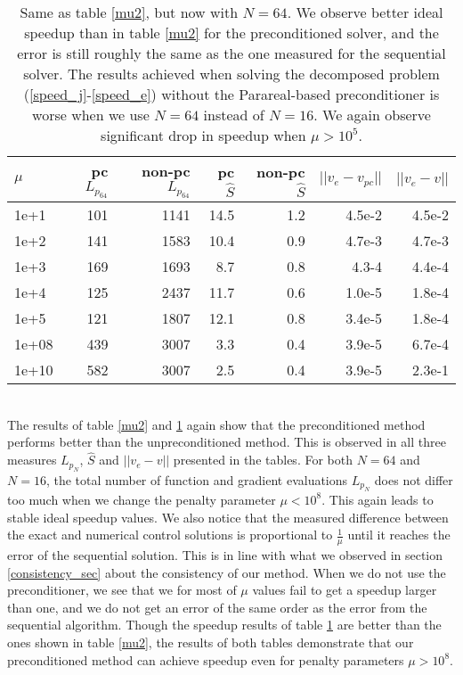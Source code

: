 \begin{table}[h!]
\centering
\caption{Same as table \ref{mu2}, but now with $N=64$. We observe better ideal speedup than in table \ref{mu2} for the preconditioned solver, and the error is still roughly the same as the one measured for the sequential solver. The results achieved when solving the decomposed problem (\ref{speed_j}-\ref{speed_e}) without the Parareal-based preconditioner is worse when we use $N=64$ instead of $N=16$. We again observe significant drop in speedup when $\mu>10^5$.}
\label{mu3}
\begin{tabular}{lrrrrrr}
\toprule
{} $\mu$&    pc $L_{p_{64}}$ & non-pc $L_{p_{64}}$    &  pc $\hat S$ & non-pc $\hat S$ &  $||v_e-v_{pc}||$ &      $||v_e-v||$\\
\midrule
1e+1  &  101 &  1141 &  14.5 &  1.2 &  4.5e-2 &  4.5e-2 \\
1e+2   &  141 &  1583 &  10.4 &  0.9 &  4.7e-3 &  4.7e-3 \\
1e+3   &  169 &  1693 &   8.7 &  0.8 &  4.3-4 &  4.4e-4 \\
1e+4  &  125 &  2437 &  11.7 &  0.6 &  1.0e-5 &  1.8e-4 \\
1e+5 &  121 &  1807 &  12.1 &  0.8 &  3.4e-5 &  1.8e-4 \\
1e+08 &  439 &  3007 &   3.3 &  0.4 &  3.9e-5 &  6.7e-4 \\
1e+10 &  582 &  3007 &   2.5 &  0.4 &  3.9e-5 &  2.3e-1 \\
\bottomrule
\end{tabular}
\end{table}
\\
The results of table \ref{mu2} and \ref{mu3} again show that the preconditioned method performs better than the unpreconditioned method. This is observed in all three measures $L_{p_N}$, $\hat S$ and $||v_e-v||$ presented in the tables. For both $N=64$ and $N=16$, the total number of function and gradient evaluations $L_{p_N}$ does not differ too much when we change the penalty parameter $\mu<10^8$. This again leads to stable ideal speedup values. We also notice that the measured difference between the exact and numerical control solutions is proportional to $\frac{1}{\mu}$ until it reaches the error of the sequential solution. This is in line with what we observed in section \ref{consistency_sec} about the consistency of our method. When we do not use the preconditioner, we see that we for most of $\mu$ values fail to get a speedup larger than one, and we do not get an error of the same order as the error from the sequential algorithm. Though the speedup results of table \ref{mu3} are better than the ones shown in table \ref{mu2}, the results of both tables demonstrate that our preconditioned method can achieve speedup even for penalty parameters $\mu>10^8$. 
